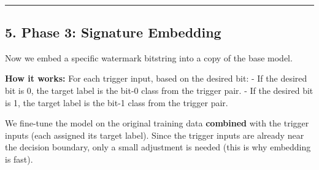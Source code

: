 \documentclass[11pt]{article}
\begin{document}
    \begin{center}
    \end{center}
    { \hspace*{\fill} \\}
    
    \begin{center}\rule{0.5\linewidth}{0.5pt}\end{center}

\subsection{5. Phase 3: Signature
Embedding}\label{phase-3-signature-embedding}

Now we embed a specific watermark bitstring into a copy of the base
model.

\textbf{How it works:} For each trigger input, based on the desired bit:
- If the desired bit is 0, the target label is the bit-0 class from the
trigger pair. - If the desired bit is 1, the target label is the bit-1
class from the trigger pair.

We fine-tune the model on the original training data \textbf{combined}
with the trigger inputs (each assigned its target label). Since the
trigger inputs are already near the decision boundary, only a small
adjustment is needed (this is why embedding is fast).
\end{document}
